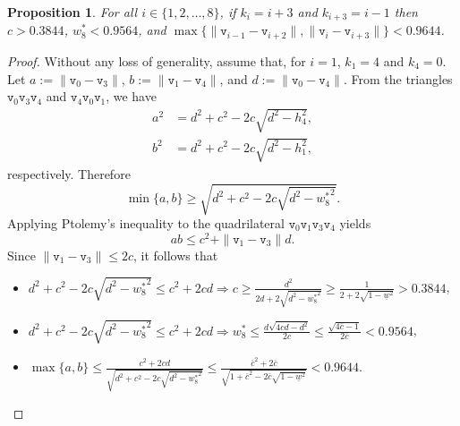\documentclass[a4paper,12pt]{article}
\theoremstyle{definition}
\theoremstyle{plain}
\newtheorem{proposition}{Proposition}
\newcommand{\ub}[1]{\overline{#1}}
\newcommand{\lb}[1]{\underline{#1}}
\newcommand{\geo}[1]{\mathtt{#1}}
\begin{document}
\begin{proposition}\label{thm:ki:tight}
	For all $i \in \{1,2,\ldots,8\}$, if $k_i = i + 3$ and $k_{i+3} = i-1$ then $c > 0.3844$, $w_8^* < 0.9564$, and $\max\{\|\geo{v}_{i-1}-\geo{v}_{i+2}\|, \|\geo{v}_{i}-\geo{v}_{i+3}\|\} < 0.9644$.
\end{proposition}
\begin{proof}
	Without any loss of generality, assume that, for $i=1$, $k_1 = 4$ and $k_4 = 0$. Let $a := \|\geo{v}_0-\geo{v}_3\|$, $b := \|\geo{v}_1-\geo{v}_4\|$, and $d := \|\geo{v}_0-\geo{v}_4\|$. From the triangles $\geo{v}_0 \geo{v}_3 \geo{v}_4$ and $\geo{v}_4 \geo{v}_0 \geo{v}_1$, we have
	\[
	\begin{aligned}
		a^2 &= d^2 + c^2 - 2c\sqrt{d^2-h_4^2},\\
		b^2 &= d^2 + c^2 - 2c\sqrt{d^2-h_1^2},
	\end{aligned}
	\]
	respectively. Therefore
	\[
	\min \{a,b\} \ge \sqrt{d^2 + c^2 - 2c\sqrt{d^2-{w_8^*}^2}}.
	\]
	Applying Ptolemy's inequality to the quadrilateral $\geo{v}_0\geo{v}_1\geo{v}_3\geo{v}_4$ yields
	\[
	ab \le c^2 + \|\geo{v}_1-\geo{v}_3\|d.
	\]
	Since $\|\geo{v}_1-\geo{v}_3\| \le 2c$, it follows that
	\begin{itemize}
		\item $d^2 + c^2 - 2c\sqrt{d^2-{w_8^*}^2} \le c^2 + 2cd \Rightarrow c \ge \frac{d^2}{2d + 2\sqrt{d^2-{w_8^*}^2}} \ge \frac{1}{2 + 2\sqrt{1-\lb{w}^2}} > 0.3844$,
		\item $d^2 + c^2 - 2c\sqrt{d^2-{w_8^*}^2} \le c^2 + 2cd \Rightarrow w_8^* \le \frac{d\sqrt{4cd-d^2}}{2c} \le \frac{\sqrt{4\ub{c}-1}}{2\ub{c}} < 0.9564$,
		\item $\max \{a,b\} \le \frac{c^2 + 2cd}{\sqrt{d^2 + c^2 - 2c\sqrt{d^2-{w_8^*}^2}}} \le \frac{\ub{c}^2 + 2\ub{c}}{\sqrt{1 + \ub{c}^2 - 2\ub{c}\sqrt{1-\lb{w}^2}}} < 0.9644$.
	\end{itemize}
\end{proof}
\end{document}
